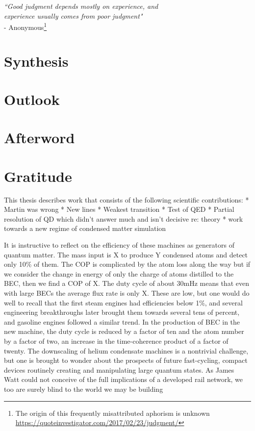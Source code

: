 
\begin{flushright}
\emph{``Good judgment depends mostly on experience, and\\ experience usually comes from poor judgment"} \\- Anonymous\footnote{The origin of this frequently misattributed aphorism is unknown \url{https://quoteinvestigator.com/2017/02/23/judgment/}}
\end{flushright}

\section{Synthesis}\label{sec:synthesis}
\section{Outlook}\label{sec:outlook}
\section{Afterword}\label{sec:afterword}
\section*{Gratitude}\label{sec:gratitude}

This thesis describes work that consists of the following scientific
contributions: * Martin was wrong * New lines * Weakest transition *
Test of QED * Partial resolution of QD which didn't answer much and
isn't decisive re: theory * work towards a new regime of condensed
matter simulation

It is instructive to reflect on the efficiency of these machines as generators of quantum matter.
	The mass input is X to produce Y condensed atoms and detect only 10\% of them.
	The COP is complicated by the atom loss along the way but if we consider the change in energy of only the charge of atoms distilled to the BEC, then we find a COP of X.
	The duty cycle of about 30mHz means that even with large BECs the average flux rate is only X.
	These are low, but one would do well to recall that the first steam engines had efficiencies below 1\%, and several engineering breakthroughs later brought them towards several tens of percent, and gasoline engines followed a similar trend.
	In the production of BEC in the new machine, the duty cycle is reduced by a factor of ten and the atom number by a factor of two, an increase in the time-coherence product of a factor of twenty.
	The downscaling of helium condensate machines is a nontrivial challenge, but one is brought to wonder about the prospects of future fast-cycling, compact devices routinely creating and manipulating large quantum states.
	As James Watt could not conceive of the full implications of a developed rail network, we too are surely blind to the world we may be building


